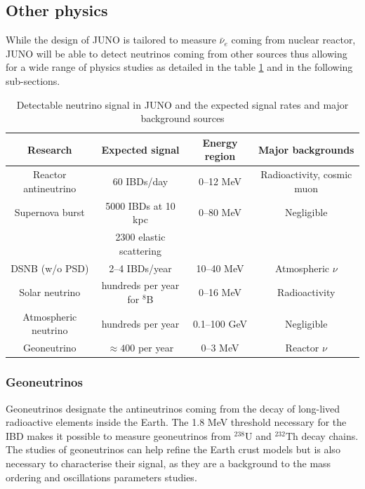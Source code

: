\subsection{Other physics}

While the design of JUNO is tailored to measure $\bar{\nu}_e$ coming from nuclear reactor, JUNO will be able to detect neutrinos coming from other sources thus allowing for a wide range of physics studies as detailed in the table \ref{tab:juno:signal} and in the following sub-sections.

\begin{table}[ht]
\begin{center}
  \begin{tabular}{|c|c|c|c|}
    \hline Research & Expected signal & Energy region & Major backgrounds \\
    \hline Reactor antineutrino & 60 IBDs/day & 0–12 MeV  & Radioactivity, cosmic muon \\
    Supernova burst & 5000 IBDs at 10 kpc & 0–80 MeV & Negligible \\
                    & 2300 elastic scattering  & &  \\
    DSNB (w/o PSD) & 2–4 IBDs/year & 10–40 MeV & Atmospheric $\nu$ \\
    Solar neutrino & hundreds per year for $^8$B & 0–16 MeV & Radioactivity \\
    Atmospheric neutrino & hundreds per year & 0.1–100 GeV  & Negligible \\
    Geoneutrino &  $\approx 400$ per year & 0–3 MeV & Reactor $\nu$ \\
    \hline
  \end{tabular}
  \caption{Detectable neutrino signal in JUNO and the expected signal rates and major background sources}
  \label{tab:juno:signal}
\end{center}
\end{table}


\subsubsection{Geoneutrinos}

Geoneutrinos designate the antineutrinos coming from the decay of long-lived radioactive elements inside the Earth. The 1.8 MeV threshold necessary for the IBD makes it possible to measure geoneutrinos from $^{238}$U and $^{232}$Th decay chains. The studies of geoneutrinos can help refine the Earth crust models but is also necessary to characterise their signal, as they are a background to the mass ordering and oscillations parameters studies.


